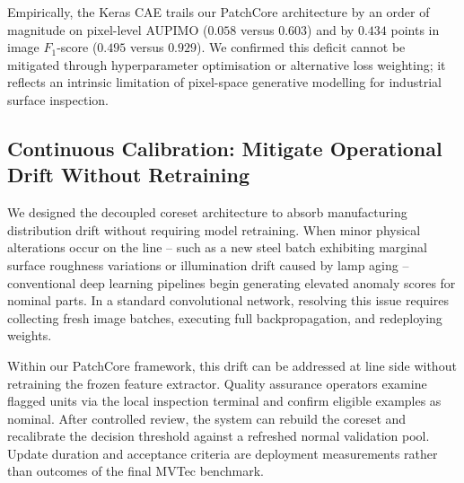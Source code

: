 Empirically, the Keras CAE trails our PatchCore architecture by an order of magnitude on pixel-level AUPIMO ($0.058$ versus $0.603$) and by $0.434$ points in image $F_1$-score ($0.495$ versus $0.929$). We confirmed this deficit cannot be mitigated through hyperparameter optimisation or alternative loss weighting; it reflects an intrinsic limitation of pixel-space generative modelling for industrial surface inspection.

\subsection{Continuous Calibration: Mitigate Operational Drift Without Retraining}

We designed the decoupled coreset architecture to absorb manufacturing distribution drift without requiring model retraining. When minor physical alterations occur on the line -- such as a new steel batch exhibiting marginal surface roughness variations or illumination drift caused by lamp aging -- conventional deep learning pipelines begin generating elevated anomaly scores for nominal parts. In a standard convolutional network, resolving this issue requires collecting fresh image batches, executing full backpropagation, and redeploying weights.

Within our PatchCore framework, this drift can be addressed at line side without retraining the frozen feature extractor. Quality assurance operators examine flagged units via the local inspection terminal and confirm eligible examples as nominal. After controlled review, the system can rebuild the coreset and recalibrate the decision threshold against a refreshed normal validation pool. Update duration and acceptance criteria are deployment measurements rather than outcomes of the final MVTec benchmark.
